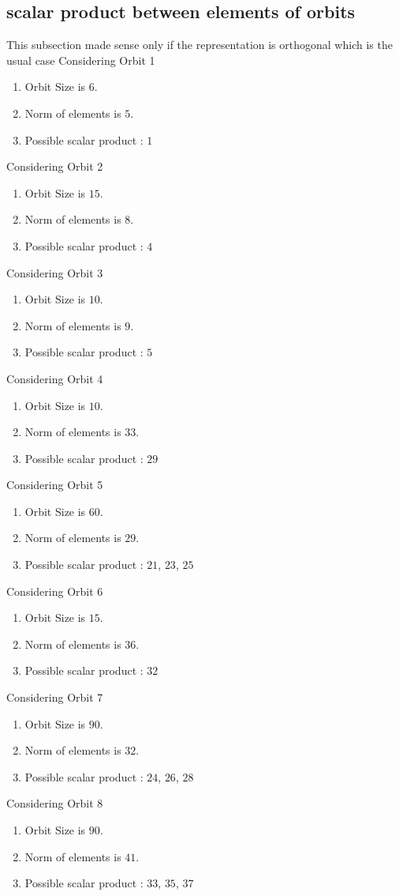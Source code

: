 \documentclass[12pt]{article}
\begin{document}
\subsection{scalar product between elements of orbits}
\noindent This subsection made sense only if the representation is orthogonal which is the usual case
Considering Orbit 1
\begin{enumerate}
\item Orbit Size is $6$.
\item Norm of elements is $5$.
\item Possible scalar product : $1$
\end{enumerate}
Considering Orbit 2
\begin{enumerate}
\item Orbit Size is $15$.
\item Norm of elements is $8$.
\item Possible scalar product : $4$
\end{enumerate}
Considering Orbit 3
\begin{enumerate}
\item Orbit Size is $10$.
\item Norm of elements is $9$.
\item Possible scalar product : $5$
\end{enumerate}
Considering Orbit 4
\begin{enumerate}
\item Orbit Size is $10$.
\item Norm of elements is $33$.
\item Possible scalar product : $29$
\end{enumerate}
Considering Orbit 5
\begin{enumerate}
\item Orbit Size is $60$.
\item Norm of elements is $29$.
\item Possible scalar product : $21$, $23$, $25$
\end{enumerate}
Considering Orbit 6
\begin{enumerate}
\item Orbit Size is $15$.
\item Norm of elements is $36$.
\item Possible scalar product : $32$
\end{enumerate}
Considering Orbit 7
\begin{enumerate}
\item Orbit Size is $90$.
\item Norm of elements is $32$.
\item Possible scalar product : $24$, $26$, $28$
\end{enumerate}
Considering Orbit 8
\begin{enumerate}
\item Orbit Size is $90$.
\item Norm of elements is $41$.
\item Possible scalar product : $33$, $35$, $37$
\end{enumerate}
\end{document}
